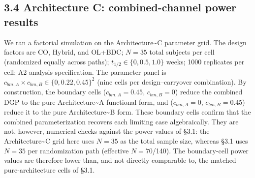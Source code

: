 \documentclass[
  11pt,
]{article}
\begin{document}
\subsection{3.4 Architecture C: combined-channel power results}

We ran a factorial simulation on the Architecture\textasciitilde C
parameter grid. The design factors are CO, Hybrid, and OL+BDC;
\(N = 35\) total subjects per cell (randomized equally across paths);
\(t_{1/2} \in \{0, 0.5, 1.0\}\) weeks; 1000 replicates per cell; A2
analysis specification. The parameter panel is \(c_{bm,A} \times
c_{bm,B} \in \{0, 0.22, 0.45\}^2\) (nine cells per design--carryover
combination). By construction, the boundary cells (\(c_{bm,A} = 0.45\),
\(c_{bm,B} = 0\)) reduce the combined DGP to the pure
Architecture\textasciitilde A functional form, and (\(c_{bm,A} = 0\),
\(c_{bm,B} = 0.45\)) reduce it to the pure Architecture\textasciitilde B
form. These boundary cells confirm that the combined parameterization
recovers each limiting case algebraically. They are not, however,
numerical checks against the power values of \S3.1: the
Architecture\textasciitilde C grid here uses \(N = 35\) as the total
sample size, whereas \S3.1 uses \(N = 35\) per randomization path
(effective \(N = 70\)/140). The boundary-cell power values are therefore
lower than, and not directly comparable to, the matched
pure-architecture cells of \S3.1.
\end{document}
